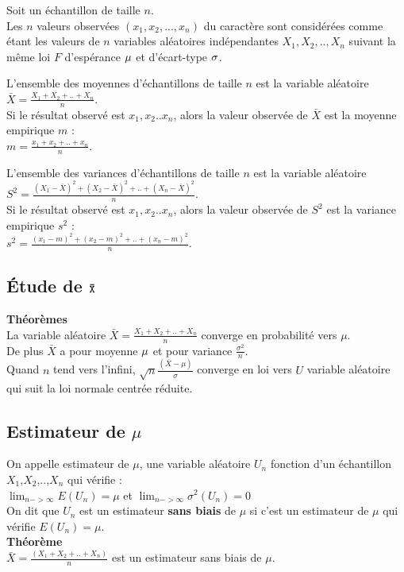 \documentclass[a4paper,11pt]{book}
\begin{document}
Soit un  \'echantillon de taille $n$.\\
 Les $n$ valeurs observ\'ees 
$(x_1,x_2,...,x_n)$ du 
caract\`ere sont consid\'er\'ees comme \'etant les valeurs de $n$ 
variables al\'eatoires ind\'ependantes $X_1,X_2,..,X_n$ suivant la  
m\^eme loi $F$ d'esp\'erance 
${\tt \mu}$ et d'\'ecart-type ${\tt \sigma}$.

L'ensemble des moyennes d'\'echantillons de taille $n$ est la variable 
al\'eatoire $\displaystyle \bar X=\frac{X_1+X_2+..+X_n}{n}$.\\
Si le r\'esultat observ\'e est $x_1,x_2..x_n$, alors la valeur observ\'ee
 de $\bar X$ est la moyenne empirique $m$ :\\
$ \displaystyle m=\frac{x_1+x_2+..+x_n}{n}$.

L'ensemble des variances d'\'echantillons de taille $n$ est la variable 
al\'eatoire $\displaystyle S^2=\frac{(X_1-\bar X)^2+(X_2-\bar X)^2+..+(X_n-\bar X)^2}{n}$.\\
Si le r\'esultat observ\'e est $ x_1,x_2..x_n$, alors  la 
valeur observ\'ee de $S^2$ est la variance 
empirique $s^2$ :\\
$\displaystyle s^2=\frac{(x_1-m)^2+(x_2-m)^2+..+(x_n-m)^2}{n}$.
\subsection{\'Etude de ${\tt \bar X}$}
{\bf Th\'eor\`emes}\\
La variable al\'eatoire $\displaystyle  \bar X=\frac{X_1+X_2+..+X_n}{n}$
converge en probabilit\'e vers $\mu$.\\
De plus $ \bar X$ a pour  moyenne ${\tt \mu}$ et pour variance $\displaystyle \frac{\sigma^2}{n}$.\\
Quand $n$ tend vers l'infini, $\displaystyle \sqrt n \frac{(\bar X-\mu)}{\sigma}$ converge en 
loi vers $U$ variable al\'eatoire qui suit la loi normale centr\'ee r\'eduite.
\subsection{Estimateur de $\mu$}\label{sec:estimu}
On appelle estimateur de $\mu$, une variable al\'eatoire $U_n$ fonction d'un 
\'echantillon $X_1$,$X_2$,..,$X_n$ qui v\'erifie :\\
$\lim_{n->\infty} E(U_n)=\mu$ et $\lim_{n->\infty}\sigma^2(U_n)=0$\\
On dit que $U_n$ est un  estimateur {\bf sans biais} de $\mu$ si c'est un  
estimateur de $\mu$ qui v\'erifie $E(U_n)=\mu$.\\ 
{\bf Th\'eor\`eme}\\
$\displaystyle  \bar X=\frac{(X_1+X_2+..+X_n)}{n}$
 est un  estimateur sans biais de $\mu$.
\end{document}
